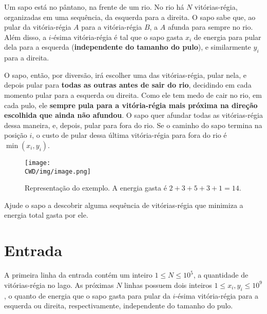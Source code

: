 %

Um sapo está no pântano, na frente de um rio. No rio há $N$ vitórias-régia, organizadas em uma sequência, da esquerda para a direita. O sapo sabe que, ao pular da vitória-régia $A$ para a vitória-régia $B$, a $A$ afunda para sempre no rio. Além disso, a $i$-ésima vitória-régia é tal que o sapo gasta $x_i$ de energia para pular dela para a esquerda (\textbf{independente do tamanho do pulo}), e similarmente $y_i$ para a direita.

O sapo, então, por diversão, irá escolher uma das vitórias-régia, pular nela, e depois pular para \textbf{todas as outras antes de sair do rio}, decidindo em cada momento pular para a esquerda ou direita. Como ele tem medo de cair no rio, em cada pulo, ele \textbf{sempre pula para a vitória-régia mais próxima na direção escolhida que ainda não afundou}. O sapo quer afundar todas as vitórias-régia dessa maneira, e, depois, pular para fora do rio. Se o caminho do sapo termina na posição $i$, o custo de pular dessa última vitória-régia para fora do rio é $\min(x_i, y_i)$.

\begin{figure}[H]
  \centering
  \texttt{[image: \\CWD/img/image.png]}
  \caption{Representação do exemplo. A energia gasta é $2+3+5+3+1=14$.}
\end{figure}

Ajude o sapo a descobrir alguma sequência de vitórias-régia que minimiza a energia total gasta por ele.

%
%

\section*{Entrada}

A primeira linha da entrada contém um inteiro $1 \leq N \leq 10^5$, a quantidade de vitórias-régia no lago. As próximas $N$ linhas possuem dois inteiros $1 \leq x_i, y_i \leq 10^9$, o quanto de energia que o sapo gasta para pular da $i$-ésima vitória-régia para a esquerda ou direita, respectivamente, independente do tamanho do pulo.

%
%

